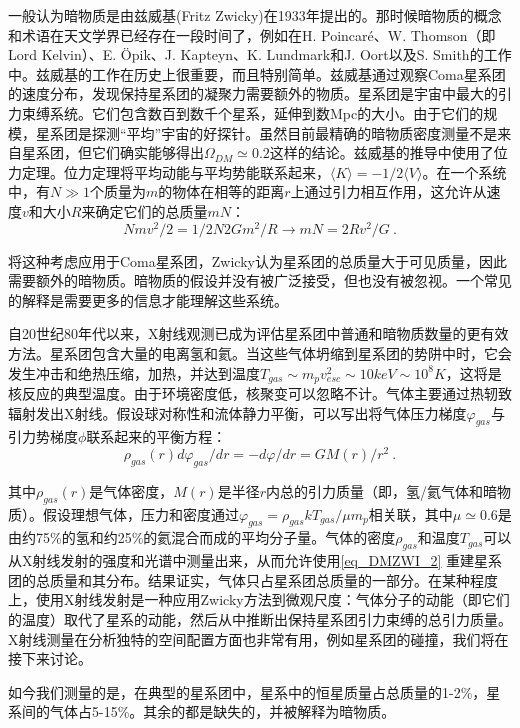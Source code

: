 

一般认为暗物质是由兹威基(Fritz Zwicky)在1933年提出的。那时候暗物质的概念和术语在天文学界已经存在一段时间了，例如在H. Poincaré、W. Thomson（即Lord Kelvin）、E. Öpik、J. Kapteyn、K. Lundmark和J. Oort以及S. Smith的工作中。兹威基的工作在历史上很重要，而且特别简单。兹威基通过观察Coma星系团的速度分布，发现保持星系团的凝聚力需要额外的物质。星系团是宇宙中最大的引力束缚系统。它们包含数百到数千个星系，延伸到数Mpc的大小。由于它们的规模，星系团是探测“平均”宇宙的好探针。虽然目前最精确的暗物质密度测量不是来自星系团，但它们确实能够得出$\Omega_{DM} \simeq 0.2$这样的结论。兹威基的推导中使用了位力定理。位力定理将平均动能与平均势能联系起来，$\langle K \rangle  = -1/2 \langle V \rangle $。在一个系统中，有$N \gg 1$个质量为$m$的物体在相等的距离$r$上通过引力相互作用，这允许从速度$v$和大小$R$来确定它们的总质量$mN$：
\begin{equation}\label{eq_DMZWI_1}
N mv^2 / 2 = 1/2 N2 G m^2 / R \rightarrow mN = 2R v^2 / G  ~.
\end{equation}


将这种考虑应用于Coma星系团，Zwicky认为星系团的总质量大于可见质量，因此需要额外的暗物质。暗物质的假设并没有被广泛接受，但也没有被忽视。一个常见的解释是需要更多的信息才能理解这些系统。

自20世纪80年代以来，X射线观测已成为评估星系团中普通和暗物质数量的更有效方法。星系团包含大量的电离氢和氦。当这些气体坍缩到星系团的势阱中时，它会发生冲击和绝热压缩，加热，并达到温度$T_{gas} \sim m_pv^2_{esc} \sim 10 keV \sim  10^8 K$，这将是核反应的典型温度。由于环境密度低，核聚变可以忽略不计。气体主要通过热轫致辐射发出X射线。假设球对称性和流体静力平衡，可以写出将气体压力梯度$\varphi_{gas}$与引力势梯度$\phi$联系起来的平衡方程：
\begin{equation}\label{eq_DMZWI_2}
\rho_{gas}(r) d\varphi_{gas}/dr = - d\varphi / dr = GM(r)/ r^2~. 
\end{equation}
 

其中$\rho_{gas}(r)$是气体密度，$M(r)$是半径$r$内总的引力质量（即，氢/氦气体和暗物质）。假设理想气体，压力和密度通过$\varphi_{gas} = \rho_{gas}kT_{gas}/\mu m_p$相关联，其中$\mu\simeq 0.6$是由约75\%的氢和约25\%的氦混合而成的平均分子量。气体的密度$\rho_{gas}$和温度$T_{gas}$可以从X射线发射的强度和光谱中测量出来，从而允许使用\autoref{eq_DMZWI_2} 重建星系团的总质量和其分布。结果证实，气体只占星系团总质量的一部分。在某种程度上，使用X射线发射是一种应用Zwicky方法到微观尺度：气体分子的动能（即它们的温度）取代了星系的动能，然后从中推断出保持星系团引力束缚的总引力质量。X射线测量在分析独特的空间配置方面也非常有用，例如星系团的碰撞，我们将在接下来讨论。



如今我们测量的是，在典型的星系团中，星系中的恒星质量占总质量的1-2\%，星系间的气体占5-15\%。其余的都是缺失的，并被解释为暗物质。